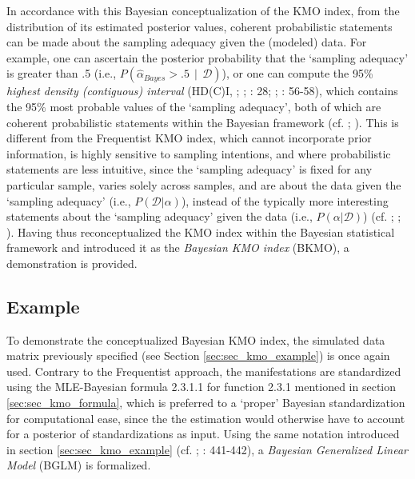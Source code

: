 \documentclass[
  10pt,
  a4paper,
  twoside]{article}
\begin{document}
In accordance with this Bayesian conceptualization of the KMO index, from the distribution of its estimated posterior values, coherent probabilistic statements can be made about the sampling adequacy given the (modeled) data. For example, one can ascertain the posterior probability that the `sampling adequacy' is greater than .5 (i.e., \(P(\hat{\alpha}_{Bayes} > .5 \:\ | \:\ \mathcal{D})\)), or one can compute the 95\% \emph{highest density (contiguous) interval} (HD(C)I, ; ; : 28; ; : 56-58), which contains the 95\% most probable values of the `sampling adequacy', both of which are coherent probabilistic statements within the Bayesian framework (cf. ; ). This is different from the Frequentist KMO index, which cannot incorporate prior information, is highly sensitive to sampling intentions, and where probabilistic statements are less intuitive, since the `sampling adequacy' is fixed for any particular sample, varies solely across samples, and are about the data given the `sampling adequacy' (i.e., \(P(\mathcal{D} | \alpha)\)), instead of the typically more interesting statements about the `sampling adequacy' given the data (i.e., \(P(\alpha | \mathcal{D})\)) (cf. ; ; ). Having thus reconceptualized the KMO index within the Bayesian statistical framework and introduced it as the \emph{Bayesian KMO index} (BKMO), a demonstration is provided.

\subsection{Example}\label{sec:sec_bkmo_example}

To demonstrate the conceptualized Bayesian KMO index, the simulated data matrix previously specified (see Section \ref{sec:sec_kmo_example}) is once again used. Contrary to the Frequentist approach, the manifestations are standardized using the MLE-Bayesian formula 2.3.1.1 for function 2.3.1 mentioned in section \ref{sec:sec_kmo_formula}, which is preferred to a `proper' Bayesian standardization for computational ease, since the the estimation would otherwise have to account for a posterior of standardizations as input. Using the same notation introduced in section \ref{sec:sec_kmo_example} (cf. ; : 441-442), a \emph{Bayesian Generalized Linear Model} (BGLM) is formalized.
\end{document}
